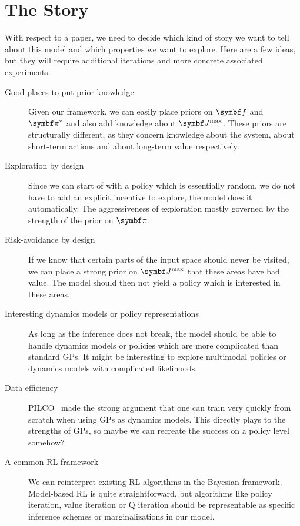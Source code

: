 \section{The Story}
\label{sec:story}
With respect to a paper, we need to decide which kind of story we want to tell about this model and which properties we want to explore.
Here are a few ideas, but they will require additional iterations and more concrete associated experiments.
\begin{description}
    \item[Good places to put prior knowledge]
        Given our framework, we can easily place priors on $\mat{f}$ and $\mat{\pi}^\ast$ and also add knowledge about $\mat{J}^\text{max}$.
        These priors are structurally different, as they concern knowledge about the system, about short-term actions and about long-term value respectively.
    \item[Exploration by design]
        Since we can start of with a policy which is essentially random, we do not have to add an explicit incentive to explore, the model does it automatically.
        The aggressiveness of exploration mostly governed by the strength of the prior on $\mat{\pi}$.
    \item[Risk-avoidance by design]
        If we know that certain parts of the input space should never be visited, we can place a strong prior on $\mat{J}^\text{max}$ that these areas have bad value.
        The model should then not yield a policy which is interested in these areas.
    \item[Interesting dynamics models or policy representations]
        As long as the inference does not break, the model should be able to handle dynamics models or policies which are more complicated than standard GPs.
        It might be interesting to explore multimodal policies or dynamics models with complicated likelihoods.
    \item[Data efficiency]
        PILCO~\parencite{deisenroth_pilco_2011} made the strong argument that one can train very quickly from scratch when using GPs as dynamics models.
        This directly plays to the strengths of GPs, so maybe we can recreate the success on a policy level somehow?
    \item[A common RL framework]
        We can reinterpret existing RL algorithms in the Bayesian framework.
        Model-based RL is quite straightforward, but algorithms like policy iteration, value iteration or Q iteration should be representable as specific inference schemes or marginalizations in our model.

\end{description}
